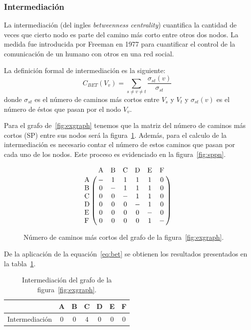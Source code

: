 \subsubsection{Intermediación}
La intermediación (del ingles \emph{betweenness centrality}) cuantifica la
cantidad de veces que cierto nodo es parte del camino más corto entre otros dos
nodos.
La medida fue introducida por Freeman en 1977\cite{freeman1977set} para
cuantificar el control de la comunicación de un humano con otros en una red
social. 

La definición formal de intermediación es la siguiente:
\begin{equation}
  \label{eq:bet}
  C_{BET}(V_v) = \sum_{s\neq v\neq t} \frac{\sigma_{st}(v)}{\sigma_{st}}
\end{equation}
donde $\sigma_{st}$ es el número de caminos más cortos entre $V_s$ y $V_t$ y 
$\sigma_{st}(v)$ es el número de éstos que pasan por el nodo $V_v$.

Para el grafo de~\ref{fig:exgraph} tenemos que la matriz del número de caminos
más cortos (SP) entre sus nodos será la figura~\ref{fig:nrosp}.
Además, para el calculo de la intermediación es necesario contar el número de
estos caminos que pasan por cada uno de los nodos.
Este proceso es evidenciado en la figura~\ref{fig:sppn}.

\begin{figure}[htpb]
  \begin{equation*}
    \bordermatrix{
       ~  & $A$ & $B$ & $C$ & $D$ & $E$ & $F$ \cr
      $A$ &  -  &  1  &  1  &  1  &  1  &  0  \cr
      $B$ &  0  &  -  &  1  &  1  &  1  &  0  \cr
      $C$ &  0  &  0  &  -  &  1  &  1  &  0  \cr
      $D$ &  0  &  0  &  0  &  -  &  1  &  0  \cr
      $E$ &  0  &  0  &  0  &  0  &  -  &  0  \cr
      $F$ &  0  &  0  &  0  &  0  &  1  &  -  \cr
    }
  \end{equation*}
  \caption{Número de caminos más cortos del grafo de la figura~\ref{fig:exgraph}.}
  \label{fig:nrosp}
\end{figure}



De la aplicación de la equación~\ref{eq:bet} se obtienen los resultados
presentados en la tabla~\ref{tab:exbet}.
\begin{table}[htpb]
  \centering
  \begin{tabular}{|l|c|c|c|c|c|c|}
    \hline         &  A  &  B  &  C  &  D  &  E  &  F  \\\hline
    Intermediación & $0$ & $0$ & $4$ & $0$ & $0$ & $0$ \\\hline
  \end{tabular}
  \caption{Intermediación del grafo de la figura~\ref{fig:exgraph}.}
  \label{tab:exbet}
\end{table}

